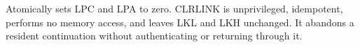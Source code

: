 Atomically sets LPC and LPA to zero. CLRLINK is unprivileged, idempotent, performs no memory access, and leaves LKL and LKH unchanged. It abandons a resident continuation without authenticating or returning through it.
